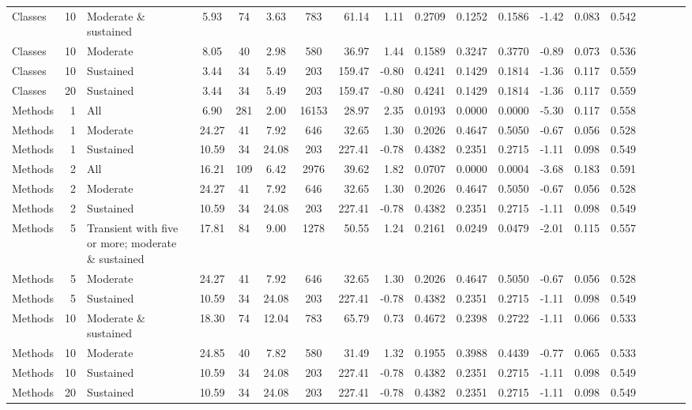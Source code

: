 \begin{table}[H]
{\begin{tabular}{l r p{4cm} c c c c r r r r r r r r r r r r}
Classes & 10 & Moderate \& sustained &  5.93 & 74 & 3.63 & 783 & 61.14 & 1.11 & 0.2709 & 0.1252 & 0.1586 & -1.42 & 0.083 & 0.542 \\ 
Classes & 10 & Moderate &  8.05 & 40 & 2.98 & 580 & 36.97 & 1.44 & 0.1589 & 0.3247 & 0.3770 & -0.89 & 0.073 & 0.536 \\ 
Classes & 10 & Sustained &  3.44 & 34 & 5.49 & 203 & 159.47 & -0.80 & 0.4241 & 0.1429 & 0.1814 & -1.36 & 0.117 & 0.559 \\ 
Classes & 20 & Sustained &  3.44 & 34 & 5.49 & 203 & 159.47 & -0.80 & 0.4241 & 0.1429 & 0.1814 & -1.36 & 0.117 & 0.559 \\ 
Methods & 1 & All &  6.90 & 281 & 2.00 & 16153 & 28.97 & 2.35 & 0.0193 & 0.0000 & 0.0000 & -5.30 & 0.117 & 0.558 \\ 
Methods & 1 & Moderate &  24.27 & 41 & 7.92 & 646 & 32.65 & 1.30 & 0.2026 & 0.4647 & 0.5050 & -0.67 & 0.056 & 0.528 \\ 
Methods & 1 & Sustained &  10.59 & 34 & 24.08 & 203 & 227.41 & -0.78 & 0.4382 & 0.2351 & 0.2715 & -1.11 & 0.098 & 0.549 \\ 
Methods & 2 & All &  16.21 & 109 & 6.42 & 2976 & 39.62 & 1.82 & 0.0707 & 0.0000 & 0.0004 & -3.68 & 0.183 & 0.591 \\ 
Methods & 2 & Moderate &  24.27 & 41 & 7.92 & 646 & 32.65 & 1.30 & 0.2026 & 0.4647 & 0.5050 & -0.67 & 0.056 & 0.528 \\ 
Methods & 2 & Sustained &  10.59 & 34 & 24.08 & 203 & 227.41 & -0.78 & 0.4382 & 0.2351 & 0.2715 & -1.11 & 0.098 & 0.549 \\ 
Methods & 5 & Transient with five or more; moderate \& sustained &  17.81 & 84 & 9.00 & 1278 & 50.55 & 1.24 & 0.2161 & 0.0249 & 0.0479 & -2.01 & 0.115 & 0.557 \\ 
Methods & 5 & Moderate &  24.27 & 41 & 7.92 & 646 & 32.65 & 1.30 & 0.2026 & 0.4647 & 0.5050 & -0.67 & 0.056 & 0.528 \\ 
Methods & 5 & Sustained &  10.59 & 34 & 24.08 & 203 & 227.41 & -0.78 & 0.4382 & 0.2351 & 0.2715 & -1.11 & 0.098 & 0.549 \\ 
Methods & 10 & Moderate \& sustained &  18.30 & 74 & 12.04 & 783 & 65.79 & 0.73 & 0.4672 & 0.2398 & 0.2722 & -1.11 & 0.066 & 0.533 \\ 
Methods & 10 & Moderate &  24.85 & 40 & 7.82 & 580 & 31.49 & 1.32 & 0.1955 & 0.3988 & 0.4439 & -0.77 & 0.065 & 0.533 \\ 
Methods & 10 & Sustained &  10.59 & 34 & 24.08 & 203 & 227.41 & -0.78 & 0.4382 & 0.2351 & 0.2715 & -1.11 & 0.098 & 0.549 \\ 
Methods & 20 & Sustained &  10.59 & 34 & 24.08 & 203 & 227.41 & -0.78 & 0.4382 & 0.2351 & 0.2715 & -1.11 & 0.098 & 0.549 \\ 
\bottomrule
\end{tabular}%
} 
\label{tab:codebase_graph_latex_repository_graph_component_time_series_statistical_significance_testprevious} 
\end{table}
\newpage 
